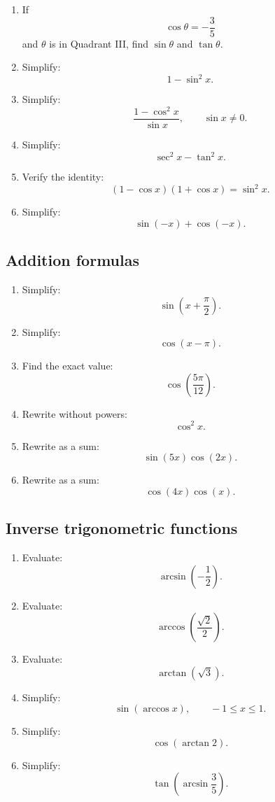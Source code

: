 \begin{enumerate}
\item If
\[
\cos\theta=-\frac35
\]
and \(\theta\) is in Quadrant III, find \(\sin\theta\) and \(\tan\theta\).

\item Simplify:
\[
1-\sin^2 x.
\]

\item Simplify:
\[
\frac{1-\cos^2 x}{\sin x},
\qquad \sin x\neq0.
\]

\item Simplify:
\[
\sec^2 x-\tan^2 x.
\]

\item Verify the identity:
\[
(1-\cos x)(1+\cos x)=\sin^2 x.
\]

\item Simplify:
\[
\sin(-x)+\cos(-x).
\]
\end{enumerate}

\subsection*{Addition formulas}

\begin{enumerate}
\item Simplify:
\[
\sin\left(x+\frac{\pi}{2}\right).
\]

\item Simplify:
\[
\cos(x-\pi).
\]

\item Find the exact value:
\[
\cos\left(\frac{5\pi}{12}\right).
\]

\item Rewrite without powers:
\[
\cos^2 x.
\]

\item Rewrite as a sum:
\[
\sin(5x)\cos(2x).
\]

\item Rewrite as a sum:
\[
\cos(4x)\cos(x).
\]
\end{enumerate}

\subsection*{Inverse trigonometric functions}

\begin{enumerate}
\item Evaluate:
\[
\arcsin\left(-\frac12\right).
\]

\item Evaluate:
\[
\arccos\left(\frac{\sqrt2}{2}\right).
\]

\item Evaluate:
\[
\arctan(\sqrt3).
\]

\item Simplify:
\[
\sin(\arccos x),
\qquad -1\le x\le1.
\]

\item Simplify:
\[
\cos(\arctan 2).
\]

\item Simplify:
\[
\tan\left(\arcsin\frac35\right).
\]
\end{enumerate}

